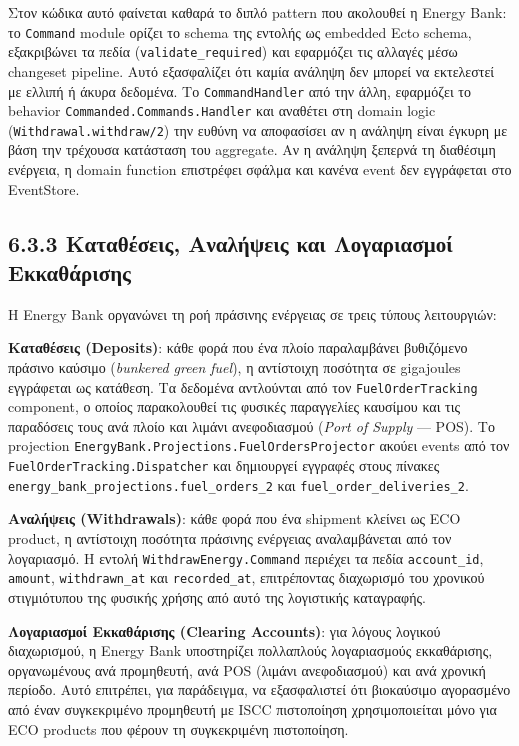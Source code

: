 Στον κώδικα αυτό φαίνεται καθαρά το διπλό pattern που ακολουθεί η Energy
Bank: το \texttt{Command} module ορίζει το schema της εντολής ως
embedded Ecto schema, εξακριβώνει τα πεδία (\texttt{validate\_required})
και εφαρμόζει τις αλλαγές μέσω changeset pipeline. Αυτό εξασφαλίζει ότι
καμία ανάληψη δεν μπορεί να εκτελεστεί με ελλιπή ή άκυρα δεδομένα. Το
\texttt{CommandHandler} από την άλλη, εφαρμόζει το behavior
\texttt{Commanded.Commands.Handler} και αναθέτει στη domain logic
(\texttt{Withdrawal.withdraw/2}) την ευθύνη να αποφασίσει αν η ανάληψη
είναι έγκυρη με βάση την τρέχουσα κατάσταση του aggregate. Αν η ανάληψη
ξεπερνά τη διαθέσιμη ενέργεια, η domain function επιστρέφει σφάλμα και
κανένα event δεν εγγράφεται στο EventStore.

\subsection{6.3.3 Καταθέσεις, Αναλήψεις και Λογαριασμοί
Εκκαθάρισης}\label{ux3baux3b1ux3c4ux3b1ux3b8ux3adux3c3ux3b5ux3b9ux3c2-ux3b1ux3bdux3b1ux3bbux3aeux3c8ux3b5ux3b9ux3c2-ux3baux3b1ux3b9-ux3bbux3bfux3b3ux3b1ux3c1ux3b9ux3b1ux3c3ux3bcux3bfux3af-ux3b5ux3baux3baux3b1ux3b8ux3acux3c1ux3b9ux3c3ux3b7ux3c2}

Η Energy Bank οργανώνει τη ροή πράσινης ενέργειας σε τρεις τύπους
λειτουργιών:

\textbf{Καταθέσεις (Deposits)}: κάθε φορά που ένα πλοίο παραλαμβάνει
βυθιζόμενο πράσινο καύσιμο (\emph{bunkered green fuel}), η αντίστοιχη
ποσότητα σε gigajoules εγγράφεται ως κατάθεση. Τα δεδομένα αντλούνται
από τον \texttt{FuelOrderTracking} component, ο οποίος παρακολουθεί τις
φυσικές παραγγελίες καυσίμου και τις παραδόσεις τους ανά πλοίο και
λιμάνι ανεφοδιασμού (\emph{Port of Supply} --- POS). Το projection
\texttt{EnergyBank.Projections.FuelOrdersProjector} ακούει events από
τον \texttt{FuelOrderTracking.Dispatcher} και δημιουργεί εγγραφές στους
πίνακες \texttt{energy\_bank\_projections.fuel\_orders\_2} και
\texttt{fuel\_order\_deliveries\_2}.

\textbf{Αναλήψεις (Withdrawals)}: κάθε φορά που ένα shipment κλείνει ως
ECO product, η αντίστοιχη ποσότητα πράσινης ενέργειας αναλαμβάνεται από
τον λογαριασμό. Η εντολή \texttt{WithdrawEnergy.Command} περιέχει τα
πεδία \texttt{account\_id}, \texttt{amount}, \texttt{withdrawn\_at} και
\texttt{recorded\_at}, επιτρέποντας διαχωρισμό του χρονικού στιγμιότυπου
της φυσικής χρήσης από αυτό της λογιστικής καταγραφής.

\textbf{Λογαριασμοί Εκκαθάρισης (Clearing Accounts)}: για λόγους λογικού
διαχωρισμού, η Energy Bank υποστηρίζει πολλαπλούς λογαριασμούς
εκκαθάρισης, οργανωμένους ανά προμηθευτή, ανά POS (λιμάνι ανεφοδιασμού)
και ανά χρονική περίοδο. Αυτό επιτρέπει, για παράδειγμα, να εξασφαλιστεί
ότι βιοκαύσιμο αγορασμένο από έναν συγκεκριμένο προμηθευτή με ISCC
πιστοποίηση χρησιμοποιείται μόνο για ECO products που φέρουν τη
συγκεκριμένη πιστοποίηση.

